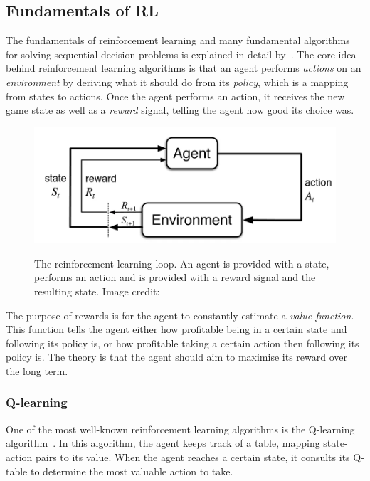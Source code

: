 \documentclass[12pt,a4paper]{article}
\begin{document}
    \subsection{Fundamentals of RL}\label{subsec:fundamentals}
    The fundamentals of reinforcement learning and many fundamental algorithms for solving sequential decision problems is explained in detail by~\citet{sutton18}.
    The core idea behind reinforcement learning algorithms is that an agent performs \emph{actions} on an \emph{environment} by deriving what it should do from its \emph{policy}, which is a mapping from states to actions.
    Once the agent performs an action, it receives the new game state as well as a \emph{reward} signal, telling the agent how good its choice was.

    \begin{figure}[ht]
        \caption[The reinforcement learning loop.]{The reinforcement learning loop. An agent is provided with a state, performs an action and is provided with a reward signal and the resulting state. Image credit: \citet{bhattrl}}
        \centering
        \includegraphics[scale=0.4]{rlgraph}
        \label{fig:rlgraph}
    \end{figure}

    The purpose of rewards is for the agent to constantly estimate a \emph{value function}.
    This function tells the agent either how profitable being in a certain state and following its policy is, or how profitable taking a certain action then following its policy is.
    The theory is that the agent should aim to maximise its reward over the long term.

    \subsubsection{Q-learning}
    One of the most well-known reinforcement learning algorithms is the Q-learning algorithm~\citep[chap.~6.5]{sutton18}.
    In this algorithm, the agent keeps track of a table, mapping state-action pairs to its value.
    When the agent reaches a certain state, it consults its Q-table to determine the most valuable action to take.
\end{document}
